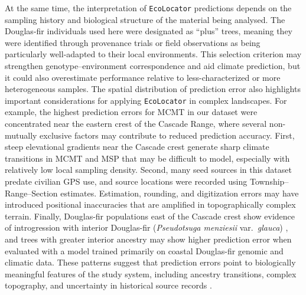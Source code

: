 \documentclass[]{article}
\newcommand{\dfir}{Douglas-fir\xspace}
\newcommand{\ecolocator}{\texttt{EcoLocator}\xspace}
\begin{document}
At the same time,
the interpretation of \ecolocator predictions depends on
the sampling history and biological structure of the material being analysed.
The \dfir individuals used here were designated as ``plus'' trees,
meaning they were identified through provenance trials
or field observations as being particularly well-adapted
to their local environments.
This selection criterion may strengthen genotype--environment correspondence
and aid climate prediction,
but it could also overestimate performance relative to
less-characterized or more heterogeneous samples.
The spatial distribution of prediction error also highlights
important considerations for applying \ecolocator in complex landscapes.
For example, the highest prediction errors for MCMT in our dataset 
were concentrated near the eastern crest of the Cascade Range,
where several non-mutually exclusive factors may contribute to reduced prediction accuracy.
First,
steep elevational gradients near the Cascade crest generate sharp climate transitions
in MCMT and MSP that may be difficult to model,
especially with relatively low local sampling density.
Second,
many seed sources in this dataset predate civilian GPS use,
and source locations were recorded using Township--Range--Section estimates.
Estimation,
rounding,
and digitization errors may have introduced
positional inaccuracies that are amplified in topographically complex terrain.
Finally,
\dfir populations east of the Cascade crest show evidence of introgression
with interior \dfir
(\textit{Pseudotsuga menziesii} var.\ \textit{glauca}) \citep{stclair_genecology_2005},
and trees with greater interior ancestry may show higher prediction error
when evaluated with a model trained primarily on coastal \dfir
genomic and climatic data.
These patterns suggest that prediction errors
point to biologically meaningful features of the study system,
including ancestry transitions,
complex topography,
and uncertainty in historical source records \citep{rehmann2024evaluating}.
\end{document}
